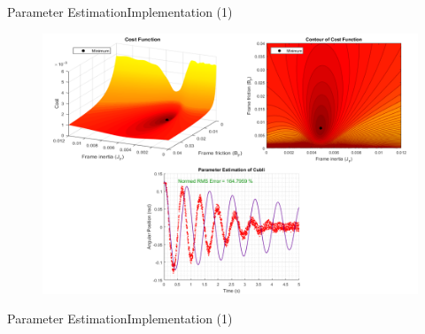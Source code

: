 \begin{frame}{Parameter Estimation}{Implementation (1)}
  \begin{figure}[H]
    \centering
    \includegraphics[width=\textwidth]{Pictures/optJoinedFit/cost-0.png}
  \end{figure}
\end{frame}

\begin{frame}{Parameter Estimation}{Implementation (1)}
\end{frame}

